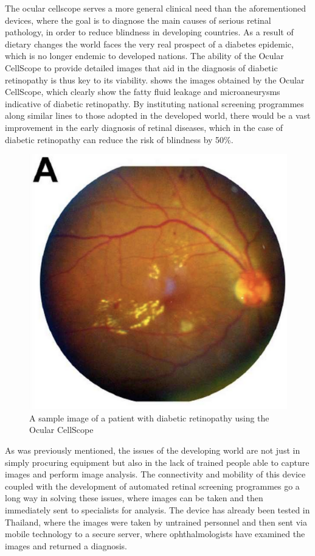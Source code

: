 The ocular cellscope serves a more general clinical need than the aforementioned
devices, where the goal is to diagnose the main causes of serious retinal pathology,
in order to reduce blindness in developing countries. As a result of dietary changes
the world faces the very real prospect of a diabetes epidemic, which is no longer
endemic to developed nations. \cite{burgess2013diabetic} The ability of the Ocular
CellScope to provide detailed images that aid in the diagnosis of diabetic retinopathy
is thus key to its viability.  shows the images obtained by the Ocular
CellScope, which clearly show the fatty fluid leakage and microaneurysms indicative of
diabetic retinopathy. By instituting national screening programmes along similar lines
to those adopted in the developed world, there would be a vast improvement in the early
diagnosis of retinal diseases, which in the case of diabetic retinopathy can reduce the
risk of blindness by 50\%. \cite{abramoff2010automated}

\begin{figure}[htbp]
\centering
 \includegraphics{figures/ocularDR}
\caption{A sample image of a patient with diabetic retinopathy using the Ocular CellScope}
\label{fig:odr}
\end{figure}

As was previously mentioned, the issues of the developing world are not just in simply
procuring equipment but also in the lack of trained people able to capture images and
perform image analysis. The connectivity and mobility of this device coupled with the
development of automated retinal screening programmes go a long way in solving these issues,
where images can be taken and then immediately sent to specialists for analysis. The
device has already been tested in Thailand, where the images were taken by untrained
personnel and then sent via mobile technology to a secure server, where ophthalmologists
have examined the images and returned a diagnosis.

